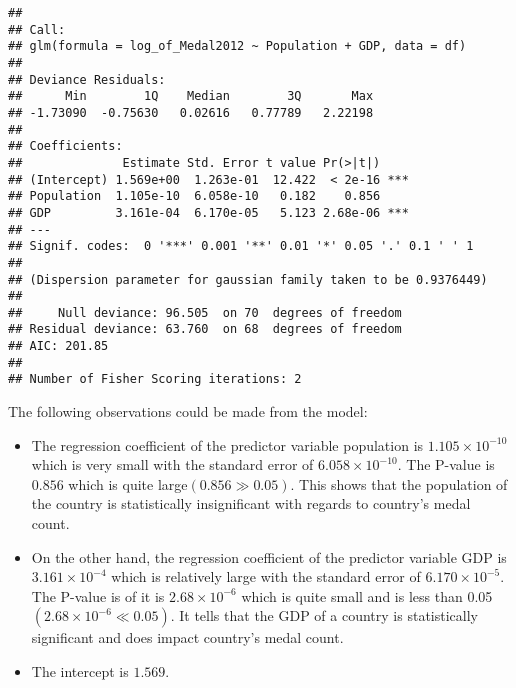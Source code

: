 \documentclass[
]{article}
\newenvironment{Shaded}{\begin{snugshade}}{\end{snugshade}}
\newcommand{\AttributeTok}[1]{\textcolor[rgb]{0.77,0.63,0.00}{#1}}
\newcommand{\FunctionTok}[1]{\textcolor[rgb]{0.00,0.00,0.00}{#1}}
\newcommand{\NormalTok}[1]{#1}
\newcommand{\OtherTok}[1]{\textcolor[rgb]{0.56,0.35,0.01}{#1}}
\newcommand{\SpecialCharTok}[1]{\textcolor[rgb]{0.00,0.00,0.00}{#1}}
\providecommand{\tightlist}{%
  \setlength{\itemsep}{0pt}\setlength{\parskip}{0pt}}
\begin{document}
\begin{Shaded}
\end{Shaded}

\begin{verbatim}
## 
## Call:
## glm(formula = log_of_Medal2012 ~ Population + GDP, data = df)
## 
## Deviance Residuals: 
##      Min        1Q    Median        3Q       Max  
## -1.73090  -0.75630   0.02616   0.77789   2.22198  
## 
## Coefficients:
##              Estimate Std. Error t value Pr(>|t|)    
## (Intercept) 1.569e+00  1.263e-01  12.422  < 2e-16 ***
## Population  1.105e-10  6.058e-10   0.182    0.856    
## GDP         3.161e-04  6.170e-05   5.123 2.68e-06 ***
## ---
## Signif. codes:  0 '***' 0.001 '**' 0.01 '*' 0.05 '.' 0.1 ' ' 1
## 
## (Dispersion parameter for gaussian family taken to be 0.9376449)
## 
##     Null deviance: 96.505  on 70  degrees of freedom
## Residual deviance: 63.760  on 68  degrees of freedom
## AIC: 201.85
## 
## Number of Fisher Scoring iterations: 2
\end{verbatim}

The following observations could be made from the model:

\begin{itemize}
\tightlist
\item
  The regression coefficient of the predictor variable population is
  \(1.105 \times 10^{-10}\) which is very small with the standard error
  of \(6.058 \times 10^{-10}\). The P-value is \(0.856\) which is quite
  large\((0.856 \gg 0.05)\). This shows that the population of the
  country is statistically insignificant with regards to country's medal
  count.
\item
  On the other hand, the regression coefficient of the predictor
  variable GDP is \(3.161 \times 10^{−4}\) which is relatively large
  with the standard error of \(6.170 \times 10^{-5}\). The P-value is of
  it is \(2.68 \times 10^{-6}\) which is quite small and is less than
  0.05\((2.68 \times 10^{-6} \ll 0.05)\). It tells that the GDP of a
  country is statistically significant and does impact country's medal
  count.
\item
  The intercept is \(1.569\).
\end{itemize}
\end{document}
